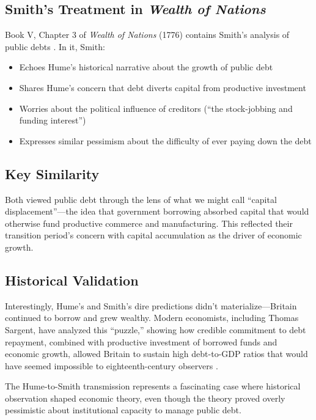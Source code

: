 \documentclass[12pt]{article}
\begin{document}
\subsection{Smith's Treatment in \textit{Wealth of Nations}}

Book V, Chapter 3 of \textit{Wealth of Nations} (1776) contains Smith's analysis of public debts \citep{smith1776}. In it, Smith:

\begin{itemize}
\item Echoes Hume's historical narrative about the growth of public debt
\item Shares Hume's concern that debt diverts capital from productive investment
\item Worries about the political influence of creditors (``the stock-jobbing and funding interest'')
\item Expresses similar pessimism about the difficulty of ever paying down the debt
\end{itemize}

\subsection{Key Similarity}

Both viewed public debt through the lens of what we might call ``capital displacement''—the idea that government borrowing absorbed capital that would otherwise fund productive commerce and manufacturing. This reflected their transition period's concern with capital accumulation as the driver of economic growth.

\subsection{Historical Validation}

Interestingly, Hume's and Smith's dire predictions didn't materialize—Britain continued to borrow and grew wealthy. Modern economists, including Thomas Sargent, have analyzed this ``puzzle,'' showing how credible commitment to debt repayment, combined with productive investment of borrowed funds and economic growth, allowed Britain to sustain high debt-to-GDP ratios that would have seemed impossible to eighteenth-century observers \citep{sargent_velde1995}.

The Hume-to-Smith transmission represents a fascinating case where historical observation shaped economic theory, even though the theory proved overly pessimistic about institutional capacity to manage public debt.
\end{document}
